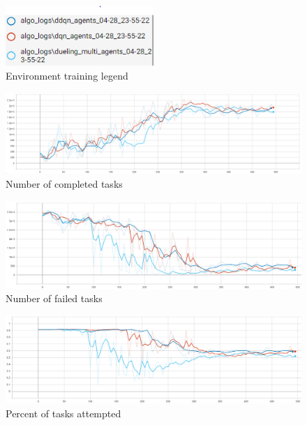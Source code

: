 \begin{figure}
    \includegraphics[width=0.5\textwidth]{figures/4_test_eval_figs/algo_training_fig/legend.PNG}
    \caption{Environment training legend}
    \label{fig:algo-training-legend}
\end{figure}

\begin{figure}[h]
    \centering
    \includegraphics[width=17cm]{figures/4_test_eval_figs/algo_training_fig/num_completed_tasks.PNG}
    \caption{Number of completed tasks}
    \label{fig:algo_num_completed_tasks}
\end{figure}

\begin{figure}[h]
    \centering
    \includegraphics[width=17cm]{figures/4_test_eval_figs/algo_training_fig/num_failed_tasks.png}
    \caption{Number of failed tasks}
    \label{fig:algo_num_failed_tasks}
\end{figure}

\begin{figure}[h]
    \centering
    \includegraphics[width=17cm]{figures/4_test_eval_figs/algo_training_fig/percent_tasks.png}
    \caption{Percent of tasks attempted}
    \label{fig:algo_percent_tasks}
\end{figure}

